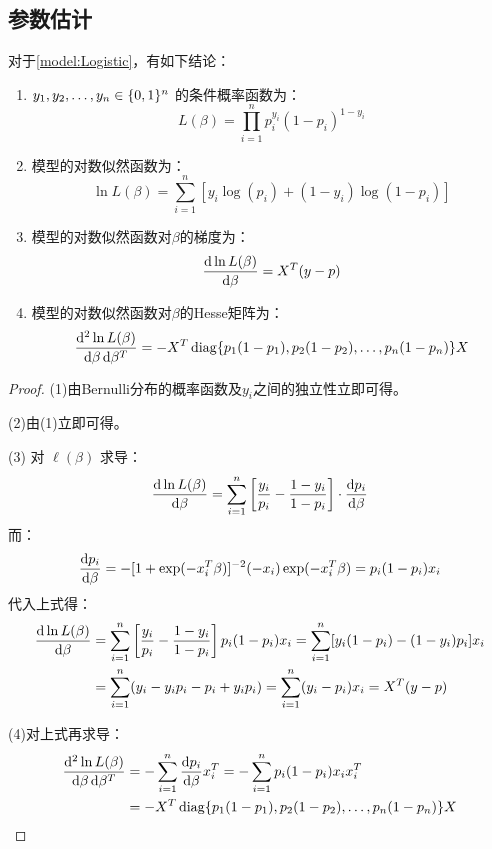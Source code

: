 \subsection{参数估计}
\begin{property}
	对于\cref{model:Logistic}，有如下结论：
	\begin{enumerate}
		\item $y_1, y_2, \dots, y_{n}\in\{0,1\}^n$ 的条件概率函数为：
		\begin{equation*}
			L(\beta) = \prod_{i=1}^{n} p_i^{y_i}(1-p_i)^{1-y_i}
		\end{equation*}
		\item 模型的对数似然函数为：
		\begin{equation*}
			\ln L(\beta)=\sum_{i=1}^{n} \left[y_i\log(p_i)+(1-y_i)\log(1-p_i)\right]
		\end{equation*}
		\item 模型的对数似然函数对$\beta$的梯度为：
		\begin{equation*}
			\frac{\mathop{}\!\mathrm{d}\ln L(\beta)}{\mathop{}\!\mathrm{d}\beta} = X^T(y - p)
		\end{equation*}
		\item 模型的对数似然函数对$\beta$的Hesse矩阵为：
		\begin{equation*}
			\frac{\mathop{}\!\mathrm{d}^2\ln L(\beta)}{\mathop{}\!\mathrm{d}\beta\mathop{}\!\mathrm{d}\beta^T}=-X^T\operatorname{diag}\{p_1(1-p_1),p_2(1-p_2),\dots,p_n(1-p_n)\}X
		\end{equation*}
	\end{enumerate}
\end{property}
\begin{proof}
	(1)由Bernulli分布的概率函数及$y_i$之间的独立性立即可得。\par
	(2)由(1)立即可得。\par
	(3) 对 $\ell(\beta)$ 求导：
	\[
	\frac{\mathop{}\!\mathrm{d}\ln L(\beta)}{\mathop{}\!\mathrm{d} \beta}
	= \sum_{i=1}^n \left[ \frac{y_i}{p_i} - \frac{1 - y_i}{1 - p_i} \right] \cdot \frac{\mathop{}\!\mathrm{d} p_i}{\mathop{}\!\mathrm{d} \beta}
	\]
	而：
	\[
	\frac{\mathop{}\!\mathrm{d} p_i}{\mathop{}\!\mathrm{d} \beta}=-[1+\exp(-x_i^T\beta)]^{-2}(-x_i)\exp(-x_i^T\beta)=p_i(1 - p_i) x_i
	\]
	代入上式得：
	\begin{align*}
		\frac{\mathop{}\!\mathrm{d}\ln L(\beta)}{\mathop{}\!\mathrm{d} \beta}&=\sum_{i=1}^{n}\left[\frac{y_i}{p_i}-\frac{1-y_i}{1-p_i}\right]p_i(1-p_i)x_i=\sum_{i=1}^{n}[y_i(1-p_i)-(1-y_i)p_i]x_i \\
		&=\sum_{i=1}^{n}(y_i-y_ip_i-p_i+y_ip_i)=\sum_{i=1}^n (y_i - p_i)x_i = X^T(y - p)
	\end{align*}\par
	(4)对上式再求导：
	\begin{align*}
		\frac{\mathop{}\!\mathrm{d}^2 \ln L(\beta)}{\mathop{}\!\mathrm{d} \beta \mathop{}\!\mathrm{d} \beta^T}
		&=-\sum_{i=1}^{n}\frac{\mathop{}\!\mathrm{d} p_i}{\mathop{}\!\mathrm{d}\beta}x_i^T=-\sum_{i=1}^{n}p_i(1-p_i)x_ix_i^T \\
		&=-X^T\operatorname{diag}\{p_1(1-p_1),p_2(1-p_2),\dots,p_n(1-p_n)\}X\qedhere
	\end{align*}
\end{proof}

